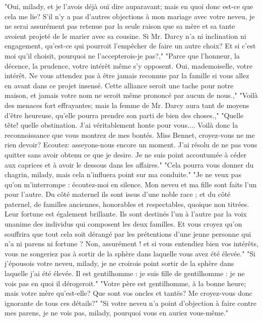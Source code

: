 \setcounter{page}{256}
"Oui, milady, et je l'avois déjà ouï dire auparavant; mais en quoi donc est-ce que cela me lie? S'il n'y a pas d'autres objections à mon mariage avec votre neveu, je ne serai assurément pas retenue par la seule raison que sa mère et sa tante avoient projeté de le marier avec sa cousine. Si Mr. Darcy n'a ni inclination ni engagement, qu'est-ce qui pourroit l'empêcher de faire un autre choix? Et si c'est moi qu'il choisit, pourquoi ne l'accepterois-je pas?,"
"Parce que l'honneur, la décence, la prudence, votre intérêt même s'y opposent. Oui, mademoiselle, votre intérêt. Ne vous attendez pas à être jamais reconnue par la famille si vous allez en avant dans ce projet insensé. Cette alliance seroit une tache pour notre maison, et jamais votre nom ne seroit même prononcé par aucun de nous.,"
"Voilà des menaces fort effrayantes; mais la femme de Mr. Darcy aura tant de moyens d'être heureuse, qu'elle pourra prendre son parti de bien des choses.,"
"Quelle tête! quelle obstination. J'ai véritablement honte pour vous.... Voilà donc la reconnoissance que vous montrez de mes bontés. Miss Bennet, croyez-vous ne me rien devoir? Ecoutez: asseyons-nous encore un moment. J'ai résolu de ne pas\setcounter{page}{257} vous quitter sans avoir obtenu ce que je desire. Je ne suis point accoutumée à céder aux caprices et à avoir le dessous dans les affaires."
"Cela pourra vous donner du chagrin, milady, mais cela n'influera point sur ma conduite."
"Je ne veux pas qu'on m'interrompe : écoutez-moi en silence. Mon neveu et ma fille sont faits l'un pour l'autre. Du côté maternel ils sont issus d'une noble race ; et du côté paternel, de familles anciennes, honorables et respectables, quoique non titrées. Leur fortune est également brillante. Ils sont destinés l'un à l'autre par la voix unanime des individus qui composent les deux familles. Et vous croyez qu'on souffrira que tout cela soit dérangé par les prétentions d'une jeune personne qui n'a ni parens ni fortune ? Non, assurément ! et si vous entendiez bien vos intérêts, vous ne songeriez pas à sortir de la sphère dans laquelle vous avez été élevée."
"Si j'épousois votre neveu, milady, je ne croirois point sortir de la sphère dans laquelle j'ai été élevée. Il est gentilhomme : je suis fille de gentilhomme : je ne vois pas en quoi il dérogeroit."
"Votre père est gentilhomme, à la bonne\setcounter{page}{258} heure; mais votre mère qu'est-elle? Que sont vos oncles et tantës? Me croyez-vous donc ignorante de tous ces détails?"
"Si votre neveu n'a point d'objection à faire contre mes parens, je ne vois pas, milady, pourquoi vous en auriez vous-même."

